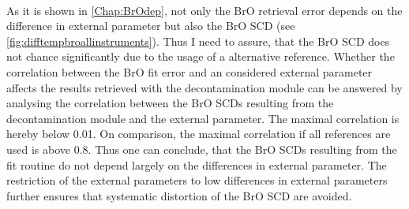 \documentclass  [
  paper    = a4,
  BCOR     = 10mm,
  twoside,
  fontsize = 12pt,
  fleqn,
  toc      = bibnumbered,
  toc      = listofnumbered,
  numbers  = noendperiod,
  headings = normal,
  listof   = leveldown,
  version  = 3.03
]                                       {scrreprt}
\begin{document}
	\\
	As it is shown in \cref{Chap:BrOdep}, not only the BrO retrieval error depends on the difference in external parameter but also the BrO SCD (see \cref{fig:difftempbroallinstruments}). 
	Thus I need to assure, that the BrO SCD does not chance significantly due to the usage of a alternative reference.
	Whether the correlation between the BrO fit error and an considered external parameter  affects the results retrieved with the decontamination module can be answered by analysing the correlation between the BrO SCDs resulting from the decontamination module and the external parameter.
	The maximal correlation is hereby below 0.01. 
	On comparison, the maximal correlation if all references are used is above 0.8. Thus one can conclude, that the BrO SCDs resulting from the fit routine do not depend largely on the differences in external parameter. The restriction of the external parameters to low differences in external parameters further ensures that systematic distortion of the BrO SCD are avoided. \\
		
%	
%
%
%
\end{document}
